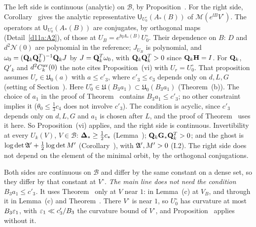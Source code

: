 \begin{detail}
\begin{step}
The left side is continuous (analytic) on $\mathcal B$, by Proposition~. For the right side, Corollary~ gives the analytic representative $\mathsf U_{U_0^\circ}(A_*(B))$ of $\mathscr M(e^{\ii B}V^\circ)$. The operators at $\mathsf U_{U_0^\circ}(A_*(B))$ are conjugates, by orthogonal maps (Detail~\ref{d11a:A2}), of those at $U_B=e^{\ii\eta A_*(B)}U_0^\circ$. Their dependence on $B$: $D$ and $d^2\mathcal N(0)$ are polynomial in the reference; $J_{U_B}$ is polynomial, and $\omega_0=(\mathbf Q_k\mathbf Q_k^T)^{-1}\mathbf Q_kJ$ by $J=\mathbf Q_k^T\omega_0$, with $\mathbf Q_k\mathbf Q_k^T>0$ since $\mathbf Q_k\mathbf H=I$. For $\mathbf Q_k$, $Q'_k$ and $d^2C^{\rm av}_k(0)$ the note cites Proposition~(vi) with $U_r=U_0^\circ$. That proposition assumes $U_r\in\mathfrak U_0(a)$ with $a\le c'_3$, where $c'_3\le c_3$ depends only on $d,L,G$ (setting of Section~). Here $U_0^\circ\in\mathfrak U(B_3a_1)\subset\mathfrak U_0(B_3a_1)$ (Theorem~(b)). The choice of $a_1$ in the proof of Theorem~ contains $B_3a_1\le c'_3$; no other constraint implies it ($\theta_0\le\frac13c_4$ does not involve $c'_3$). The condition is acyclic, since $c'_3$ depends only on $d,L,G$ and $a_1$ is chosen after $L$, and the proof of Theorem~ uses it here. So Proposition~(vi) applies, and the right side is continuous. Invertibility at every $U_k(V)$, $V\in\mathcal B$: $\boldsymbol{\Delta}_*\ge\frac12c_*$ (Lemma~); $\mathbf Q_k\mathbf G_*\mathbf Q_k^T>0$; and the ghost is $\log\det\mathfrak A'+\frac12\log\det M'$ (Corollary~), with $\mathfrak A',M'>0$ (I.2). The right side does not depend on the element of the minimal orbit, by the orthogonal conjugations.
\end{step}
\begin{step}
Both sides are continuous on $\mathcal B$ and differ by the same constant on a dense set, so they differ by that constant at $V^\circ$. \emph{The main line does not need the condition $B_3a_1\le c'_3$.} It uses Theorem~ only at $V$ near $1$: in Lemma~(c) at $V_B$, and through it in Lemma~(c) and Theorem~. There $V^\circ$ is near $1$, so $U_0^\circ$ has curvature at most $B_3\varepsilon_1$, with $\varepsilon_1\ll c'_3/B_3$ the curvature bound of $V^\circ$, and Proposition~ applies without it.
\end{step}
\end{detail}

